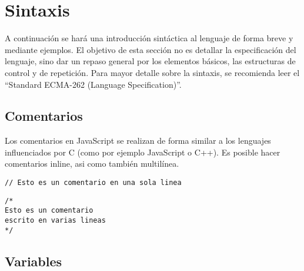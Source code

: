 \section{Sintaxis}

A continuación se hará una introducción sintáctica al lenguaje de forma breve y mediante ejemplos. El objetivo de esta sección no es detallar la especificación del lenguaje, sino dar un repaso general por los elementos básicos, las estructuras de control y de repetición. Para mayor detalle sobre la sintaxis, se recomienda leer el "`Standard ECMA-262 (Language Specification)"'.

\subsection{Comentarios}

Los comentarios en JavaScript se realizan de forma similar a los lenguajes influenciados por C (como por ejemplo JavaScript o C++). Es posible hacer comentarios inline, asi como también multilínea.

\begin{lstlisting}[title={Comentario inline}]
// Esto es un comentario en una sola linea
\end{lstlisting}

\begin{lstlisting}[title={Comentario multilinea}]
/* 
Esto es un comentario
escrito en varias lineas
*/
\end{lstlisting}

\subsection{Variables}

